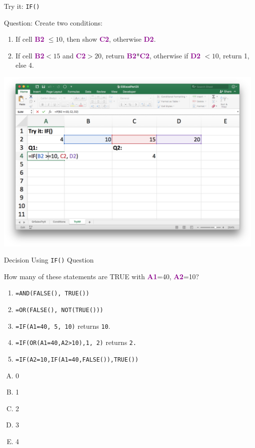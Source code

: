 \documentclass[xcolor=svgnames]{beamer}
\newcommand{\cell}[1]{{\sf \textbf{\textcolor{DarkMagenta}{#1}}}}
\begin{document}
\begin{frame}{Try it: {\tt IF()}}
\begin{exampleblock}{}{Question: Create two conditions:}
\begin{enumerate}
\item If cell \cell{B2} $\leq 10$, then show \cell{C2}, otherwise \cell{D2}.
\item If cell  \cell{B2}$ < 15$ and \cell{C2}$ > 20$, return \cell{B2}*\cell{C2}, otherwise if \cell{D2} $ < 10$, return 1, else 4.
\end{enumerate}
\end{exampleblock}
\begin{center}
\includegraphics[width=.9\textwidth]{TryItIf2.png}
\end{center}
\end{frame}

\begin{frame}[fragile]{Decision Using {\tt IF()} Question}
  \begin{example}
How many of these statements are TRUE with \cell{A1}=40, \cell{A2}=10?
 \begin{enumerate}
\item \verb|=AND(FALSE(), TRUE())|
\item \verb|=OR(FALSE(), NOT(TRUE()))|
\item \verb|=IF(A1=40, 5, 10)| returns {\tt 10}.
\item \verb|=IF(OR(A1=40,A2>10),1, 2)| returns \tt 2.
\item \verb|=IF(A2=10,IF(A1=40,FALSE()),TRUE())|
 \end{enumerate}
\begin{multicols}{5}
\begin{enumerate}[A)]
\item 0 
\item 1
\item 2
\item 3
\item 4
\end{enumerate}
\end{multicols}
  \end{example} 
\end{frame}
\end{document}
